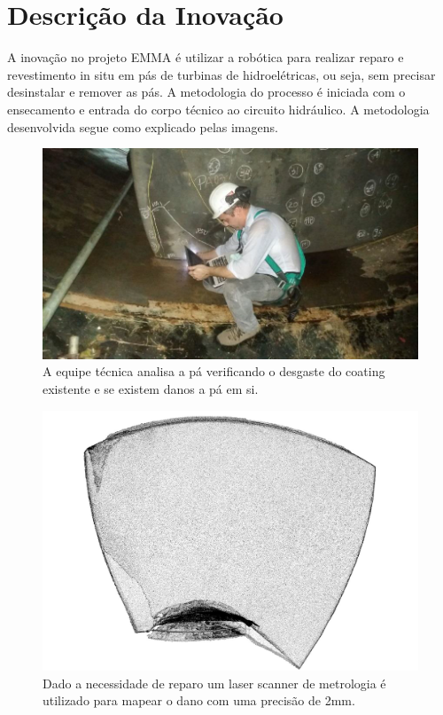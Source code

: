 
\section{Descrição da Inovação}

A inovação no projeto EMMA é utilizar a robótica para realizar reparo e
revestimento in situ em pás de turbinas de hidroelétricas, ou seja, sem precisar
desinstalar e remover as pás. A metodologia do processo é iniciada com o
ensecamento e entrada do corpo técnico ao circuito hidráulico. A metodologia
desenvolvida segue como explicado pelas imagens.

\begin{figure}[H]
\centering
\includegraphics[width=0.9\columnwidth]{figs/manolo}
\caption{A equipe técnica analisa a pá verificando o desgaste do coating
existente e se existem danos a pá em si.}
\end{figure}

\begin{figure}[H]
\centering
\includegraphics[width=0.9\columnwidth]{figs/modelo_pa_faro}
\caption{Dado a necessidade de reparo um laser scanner de metrologia é utilizado
para mapear o dano com uma precisão de 2mm.}
\end{figure}

